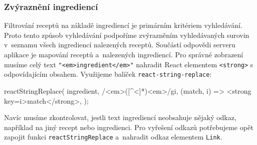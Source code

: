 \subsubsection{Zvýraznění ingrediencí}

Filtrování receptů na základě ingrediencí je primárním kritériem vyhledávání. Proto tento způsob vyhledávání podpoříme zvýrazněním vyhledávaných surovin v~seznamu všech ingrediencí nalezených receptů. Součástí odpovědi serveru aplikace je mapování receptů a~nalezených ingrediencí. Pro správné zobrazení musíme celý text \texttt{"}\texttt{<em>ingredient</em>"} nahradit React elementem \texttt{<strong>} s odpovídajícím obsahem. Využijeme balíček \texttt{react-string-replace}:
\begin{code}
reactStringReplace(
  ingredient,
  /<em>([^<]*)<\/em>/gi,
  (match, i) => <strong key={i}>{match}</strong>,
);
\end{code}
Navíc musíme zkontrolovat, jestli text ingrediencí neobsahuje nějaký odkaz, například na jiný recept nebo ingredienci. Pro vyřešení odkazů potřebujeme opět zapojit funkci \texttt{reactStringReplace} a~nahradit odkaz elementem \texttt{Link}.
